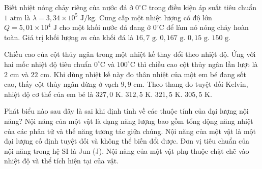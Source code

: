 \begin{ex}%
	Biết nhiệt nóng chảy riêng của nước đá ở $0^\circ\text{C}$ trong điều kiện áp suất tiêu chuẩn $1\text{ atm}$ là $\lambda = 3,34 \times 10^{5}\text{ J/kg}$. Cung cấp một nhiệt lượng có độ lớn $Q = 5,01 \times 10^{4}\text{ J}$ cho một khối nước đá đang ở $0^\circ\text{C}$ để làm nó nóng chảy hoàn toàn. Giá trị khối lượng $m$ của khối đá là
	\choice
	{$16,7\text{ g}$.}
	{$0,167\text{ g}$.}
	{$0,15\text{ g}$.}
	{\True $150\text{ g}$.}
\end{ex}

\begin{ex}%
	Chiều cao của cột thủy ngân trong một nhiệt kế thay đổi theo nhiệt độ. Ứng với hai mốc nhiệt độ tiêu chuẩn $0^\circ\text{C}$ và $100^\circ\text{C}$ thì chiều cao cột thủy ngân lần lượt là $2\text{ cm}$ và $22\text{ cm}$. Khi dùng nhiệt kế này đo thân nhiệt của một em bé đang sốt cao, thấy cột thủy ngân dừng ở vạch $9,9\text{ cm}$. Theo thang đo tuyệt đối Kelvin, nhiệt độ cơ thể của em bé là
	\choice
	{$327,0\text{ K}$.}
	{\True $312,5\text{ K}$.}
	{$321,5\text{ K}$.}
	{$305,5\text{ K}$.}
\end{ex}

\begin{ex}%
	Phát biểu nào sau đây là sai khi định tính về các thuộc tính của đại lượng nội năng?
	\choice
	{Nội năng của một vật là dạng năng lượng bao gồm tổng động năng nhiệt của các phân tử và thế năng tương tác giữa chúng.}
	{\True Nội năng của một vật là một đại lượng cố định tuyệt đối và không thể biến đổi được.}
	{Đơn vị tiêu chuẩn của nội năng trong hệ SI là Jun (J).}
	{Nội năng của một vật phụ thuộc chặt chẽ vào nhiệt độ và thể tích hiện tại của vật.}
\end{ex}

